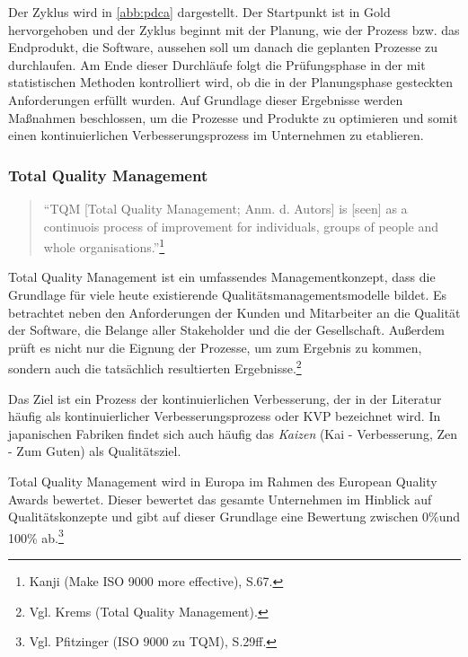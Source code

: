             Der Zyklus wird in \autoref{abb:pdca} dargestellt. Der Startpunkt ist in Gold hervorgehoben und der Zyklus beginnt mit der Planung, wie der Prozess bzw. das Endprodukt, die Software, aussehen soll um danach die geplanten Prozesse zu durchlaufen. Am Ende dieser Durchläufe folgt die Prüfungsphase in der mit statistischen Methoden kontrolliert wird, ob die in der Planungsphase gesteckten Anforderungen erfüllt wurden. Auf Grundlage dieser Ergebnisse werden Maßnahmen beschlossen, um die Prozesse und Produkte zu optimieren und somit einen kontinuierlichen Verbesserungsprozess im Unternehmen zu etablieren.

            \subsubsection{Total Quality Management}

            \begin{quote}
              \enquote{TQM [Total Quality Management; Anm. d. Autors] is [seen] as a continuois process of improvement for individuals, groups of people and whole organisations.}\footnote{Kanji (Make ISO 9000 more effective), S.67.}
            \end{quote}

            Total Quality Management ist ein umfassendes Managementkonzept, dass die Grundlage für viele heute existierende Qualitätsmanagementsmodelle bildet. Es betrachtet neben den Anforderungen der Kunden und Mitarbeiter an die Qualität der Software, die Belange aller Stakeholder und die der Gesellschaft. Außerdem prüft es nicht nur die Eignung der Prozesse, um zum Ergebnis zu kommen, sondern auch die tatsächlich resultierten Ergebnisse.\footnote{Vgl. Krems (Total Quality Management).}

            Das Ziel ist ein Prozess der kontinuierlichen Verbesserung, der in der Literatur häufig als kontinuierlicher Verbesserungsprozess oder KVP bezeichnet wird. In japanischen Fabriken findet sich auch häufig das \emph{Kaizen} (Kai - Verbesserung, Zen - Zum Guten) als Qualitätsziel.

            Total Quality Management wird in Europa im Rahmen des European Quality Awards bewertet. Dieser bewertet das gesamte Unternehmen im Hinblick auf Qualitätskonzepte und gibt auf dieser Grundlage eine Bewertung zwischen 0\%und 100\% ab.\footnote{Vgl. Pfitzinger (ISO 9000 zu TQM), S.29ff.}

